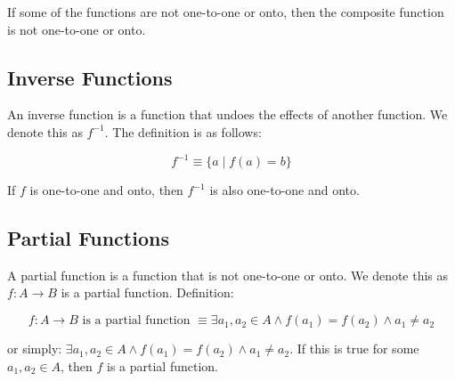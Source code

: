 \documentclass[11pt]{article}
\begin{document}
If some of the functions are not one-to-one or onto, then the composite function is not one-to-one or onto.


\subsection{Inverse Functions}
\label{sec:org30ed0cf}
An inverse function is a function that undoes the effects of another function. We denote this as \(f^{-1}\). The definition is as follows:

\[
f^{-1} \equiv \{a \mid f(a) = b\}
\]

If \(f\) is one-to-one and onto, then \(f^{-1}\) is also one-to-one and onto.

\subsection{Partial Functions}
\label{sec:org646e3cf}
A partial function is a function that is not one-to-one or onto. We denote this as \(f: A \rightarrow B\) is a partial function. Definition:

\[
f: A \rightarrow B \text{ is a partial function } \equiv \exists a_1, a_2 \in A \land f(a_1) = f(a_2) \land a_1 \neq a_2
\]

or simply: \(\exists a_1, a_2 \in A \land f(a_1) = f(a_2) \land a_1 \neq a_2\). If this is true for some \(a_1, a_2 \in A\), then \(f\) is a partial function.
\end{document}

